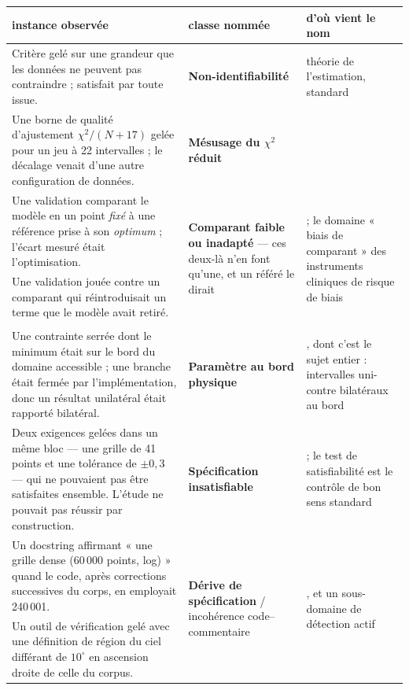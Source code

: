 \documentclass[11pt,a4paper]{article}
\begin{document}
\begin{table}[t]
\centering
\small
\begin{tabular}{p{4.9cm}p{3.6cm}p{5.9cm}}
\toprule
instance observée & classe nommée & d'où vient le nom \\
\midrule
Critère gelé sur une grandeur que les données ne peuvent pas contraindre ; satisfait par
toute issue. &
\textbf{Non-identifiabilité} & théorie de l'estimation, standard \\
\addlinespace
Une borne de qualité d'ajustement $\chi^2/(N+17)$ gelée pour un jeu à 22 intervalles ; le
décalage venait d'une autre configuration de données. &
\textbf{Mésusage du $\chi^2$ réduit} & \citet{andrae2010} \\
\addlinespace
Une validation comparant le modèle en un point \emph{fixé} à une référence prise à son
\emph{optimum} ; l'écart mesuré était l'optimisation. &
\multirow{3}{3.4cm}{\textbf{Comparant faible ou inadapté} --- ces deux-là n'en font qu'une, et
un référé le dirait} &
\multirow{3}{5.7cm}{\citet{dacrema2019} ; le domaine « biais de comparant » des instruments
cliniques de risque de biais} \\
Une validation jouée contre un comparant qui réintroduisait un terme que le modèle avait
retiré. & & \\
 & & \\
\addlinespace
Une contrainte serrée dont le minimum était sur le bord du domaine accessible ; une branche
était fermée par l'implémentation, donc un résultat unilatéral était rapporté bilatéral. &
\textbf{Paramètre au bord physique} & \citet{feldman1998}, dont c'est le sujet entier :
intervalles uni- contre bilatéraux au bord \\
\addlinespace
Deux exigences gelées dans un même bloc --- une grille de 41 points et une tolérance de
$\pm0{,}3$ --- qui ne pouvaient pas être satisfaites ensemble. L'étude ne pouvait pas réussir
par construction. &
\textbf{Spécification insatisfiable} & \citet{rozier2007} ; le test de satisfiabilité est le
contrôle de bon sens standard \\
\addlinespace
Un docstring affirmant « une grille dense (60\,000 points, log) » quand le code, après
corrections successives du corps, en employait 240\,001. &
\multirow{3}{3.4cm}{\textbf{Dérive de spécification} / incohérence code--commentaire} &
\multirow{3}{5.7cm}{\citet{panthaplackel2021}, et un sous-domaine de détection actif} \\
Un outil de vérification gelé avec une définition de région du ciel différant de $10^\circ$
en ascension droite de celle du corpus. & & \\

\end{tabular}
\end{table}
\end{document}
